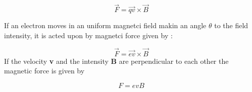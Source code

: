 \documentclass[a4paper,20pt,twoside]{report}
\begin{document}
	\begin{equation}
	\vec{F} = \vec{qv} \times \vec{B}
	\end{equation}
	
	If an electron moves in an uniform magnetci field makin an angle $\theta$ to the field intensity, it is acted upon by magnetci force given by : 
	
	\begin{equation}
	\vec{F} = \vec{ev} \times \vec{B}
	\end{equation}
	If the velocity \textbf{v} and the intensity \textbf{B} are perpendicular to each other the magnetic
	force is given by 
	
	\begin{equation}
	F = evB
	\end{equation}
	
	
  	
\end{document}
